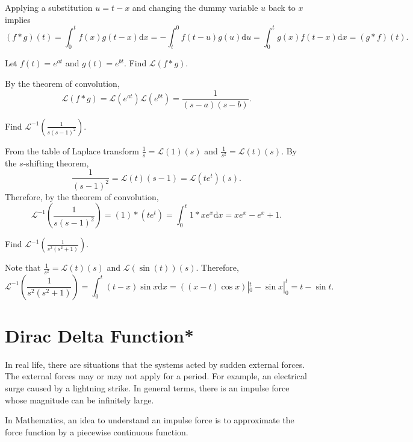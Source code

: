 Applying a substitution $u=t-x$ and changing the dummy variable $u$ back to $x$ implies
\[(f*g)(t)=\int_0^t f(x)g(t-x)\mathrm{d} x=-\int_t^0 f(t-u)g(u)\mathrm{d} u=\int_0^t g(x)f(t-x)\mathrm{d} x=(g*f)(t).\]

\begin{example}
Let $f(t)=e^{at}$ and $g(t)=e^{bt}$. Find $\mathcal{L}(f*g)$.
\end{example}
\begin{solution}
By the theorem of convolution,
\[\mathcal{L}(f*g)=\mathcal{L}(e^{at})\mathcal{ L}(e^{bt})=\frac{1}{(s-a)(s-b)}.\]
\end{solution}

\begin{example}
  Find $\mathcal{L}^{-1}\left(\frac{1}{s(s-1)^2}\right)$.
  \end{example}
  \begin{solution}
  From the table of Laplace transform $\frac1s=\mathcal{L}(1)(s)$ and $\frac{1}{s^2}=\mathcal{L}(t)(s)$. By the $s$-shifting theorem, 
  \[\frac{1}{(s-1)^2}=\mathcal{L}(t)(s-1)=\mathcal{L}(te^t)(s).\]
  Therefore, by the theorem of convolution,
  \[\mathcal{L}^{-1}\left(\frac{1}{s(s-1)^2}\right)=(1)*(te^t)=\int_0^t1*xe^x\mathrm{d} x=xe^x-e^x+1.\]
\end{solution}

\begin{exercise}
  Find $\mathcal{L}^{-1}\left(\frac{1}{s^2(s^2+1)}\right)$.
\end{exercise}
\begin{solution}
  Note that $\frac{1}{s^2}=\mathcal{L}(t)(s)$ and $\mathcal{L}(\sin(t))(s)$. Therefore,
  \[\mathcal{L}^{-1}\left(\frac{1}{s^2(s^2+1)}\right)=\int_0^t(t-x)\sin x\mathrm{d} x=((x-t)\cos x)|_0^t-\sin x|_0^t=t-\sin t.\]
\end{solution}

\section{Dirac Delta Function*}

In real life, there are situations that the systems acted by sudden external forces. The external forces may or may not apply for a period. For example, an electrical surge caused by a lightning strike. In general terms, there is an impulse force whose magnitude can be infinitely large.

In Mathematics, an idea to understand an impulse force is to approximate the force function by a piecewise continuous function.

